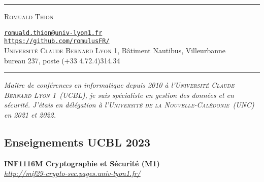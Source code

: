 \documentclass[12pt,a4paper]{article}
\newcommand{\hr}{\textcolor{gris80}{\rule{\linewidth}{0.5pt}}}
\newcommand{\activite}[1]{\textbf{#1}\xspace}
\newcommand{\comment}[1]{\textsl{#1}\xspace}
\newcommand{\UCBL}{\textsc{Universit{\'e} Claude Bernard Lyon 1}\xspace}
\newcommand{\UNC}{\textsc{Universit{\'e} de la Nouvelle-Calédonie}\xspace}
\begin{document}
\hr

\vspace{0.5em}

\begin{minipage}[c]{0.5\textwidth}
  \begin{center}
    {\LARGE\textsc{Romuald Thion}} %
  \end{center}
\end{minipage}
\begin{minipage}[c]{0.5\textwidth}
  \begin{center}
    \href{mailto:romuald.thion@univ-lyon1.fr}{\nolinkurl{romuald.thion@univ-lyon1.fr}}\\
    \href{https://github.com/romulusFR/}{\nolinkurl{https://github.com/romulusFR/}}\\
    \UCBL, Bâtiment Nautibus, Villeurbanne\\
    bureau 237, poste (+33 4.72.4)314.34
  \end{center}
\end{minipage}

\vspace{0.5em}

\hr

\begin{center}
  \emph{Maître de conférences en informatique depuis 2010 à l'\UCBL~(UCBL), je suis spécialiste en gestion des données et en sécurité. J'étais en délégation à l'\UNC~(UNC) en 2021 et 2022.}
\end{center}

\subsection*{Enseignements UCBL 2023}
\activite{INF1116M Cryptographie et Sécurité (M1)}\\
\comment{\url{http://mif29-crypto-sec.pages.univ-lyon1.fr/}}
\end{document}
